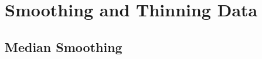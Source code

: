 \documentclass[10pt,paper=a4,headings=standardclasses
]{scrartcl}
\begin{document}

\section{Smoothing and Thinning Data}

\subsection{Median Smoothing}
\end{document}
